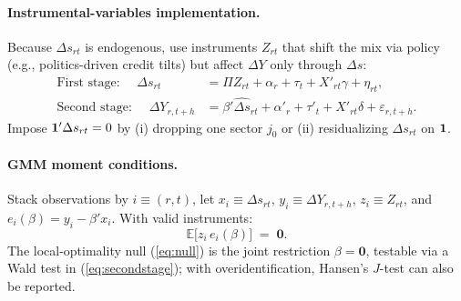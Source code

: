 \documentclass{article}
\begin{document}
\paragraph{Instrumental-variables implementation.}
Because $\Delta s_{rt}$ is endogenous, use instruments $Z_{rt}$ that shift the mix via policy (e.g., politics-driven credit tilts)
but affect $\Delta Y$ only through $\Delta s$:
\begin{align}
    \text{First stage: } \quad
    \Delta s_{rt}    & = \Pi Z_{rt} + \alpha_r + \tau_t + X'_{rt}\gamma + \eta_{rt}, \label{eq:firststage}                                  \\
    \text{Second stage: } \quad
    \Delta Y_{r,t+h} & = \beta' \widehat{\Delta s}_{rt} + \alpha'_r + \tau'_t + X'_{rt}\delta + \varepsilon_{r,t+h}. \label{eq:secondstage}
\end{align}
Impose $\mathbf{1}'\Delta s_{rt}=0$ by (i) dropping one sector $j_0$ or (ii) residualizing $\Delta s_{rt}$ on $\mathbf{1}$.

\paragraph{GMM moment conditions.}
Stack observations by $i\equiv(r,t)$, let $x_i\equiv\Delta s_{rt}$, $y_i\equiv\Delta Y_{r,t+h}$, $z_i\equiv Z_{rt}$,
and $e_i(\beta)=y_i-\beta' x_i$.
With valid instruments:
\begin{equation}
    \label{eq:moments}
    \mathbb{E}\big[z_i\, e_i(\beta)\big] \;=\; \mathbf{0}.
\end{equation}
The local-optimality null (\ref{eq:null}) is the joint restriction $\beta=\mathbf{0}$, testable via a Wald test in
(\ref{eq:secondstage}); with overidentification, Hansen's $J$-test can also be reported.

\end{document}
